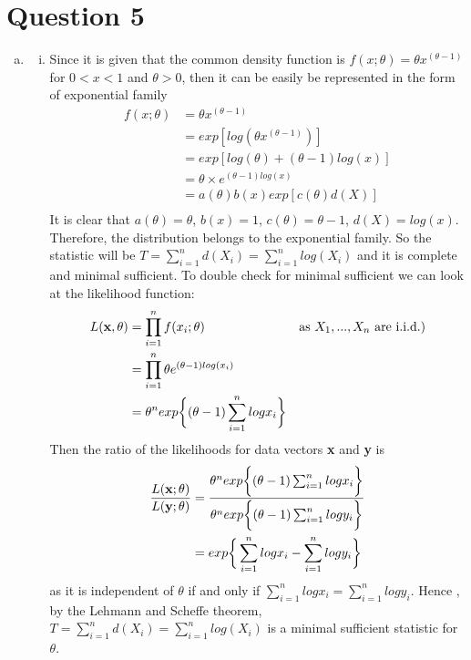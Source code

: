 \documentclass[a4paper,11pt]{article}
\begin{document}
\section{Question 5}
\begin{enumerate}[(a)]
	\item
	\begin{enumerate}[(i)]
		\item
			Since it is given that the common density function is $f(x;\theta) = \theta x^{(\theta-1)}$ for  $0<x<1$ and $\theta>0$, then  it can be easily be represented in the form of exponential family
			\begin{align*}
				f(x;\theta) &= \theta x^{(\theta-1)} \\
				&= exp[ log( \theta x^{(\theta-1)} )] \\
				&= exp[ log(\theta)+(\theta-1)log(x)]\\
				&= \theta \times e^{(\theta-1)log(x)}\\
				&= a(\theta)b(x) exp[c(\theta)d(X)]\\
			\end{align*}
			It is clear that $a(\theta) = \theta$, $b(x)=1$, $c(\theta)=\theta-1$, $d(X)=log(x)$. Therefore, the distribution belongs to the exponential family. So the statistic will be $T = \sum^n_{i=1}d(X_i) =  \sum^n_{i=1} log(X_i)$ and it is complete and minimal sufficient. To double check for minimal sufficient we can look at the likelihood function:
			\begin{align*}
			L({\bf x}, \theta) &= \prod^n_{i=1}f(x_i;\theta) & \mbox{as }X_1, ... , X_n\mbox{ are i.i.d.)}\\
			&= \prod^n_{i=1} \theta e^{(\theta-1)log(x_i)}\\
			&=\theta^n exp\bigg\{(\theta-1)\sum^n_{i=1} log x_i \bigg\}
			\end{align*}
			Then the ratio of the likelihoods for data vectors {\bf x} and {\bf y} is
			\begin{align*}
			 \frac{L({\bf x};\theta)}{L({\bf y};\theta)}&=\frac{\theta^n exp\bigg\{(\theta-1)\sum^n_{i=1} log x_i \bigg\}}{\theta^n exp\bigg\{(\theta-1)\sum^n_{i=1} log y_i \bigg\}}\\
			&=exp\bigg\{\sum^n_{i=1} log x_i-\sum^n_{i=1} log y_i \bigg\}\\
			\end{align*}
			as it is independent of $\theta$ if and only if $\sum^n_{i=1} log x_i=\sum^n_{i=1} log y_i$. Hence , by the Lehmann and Scheffe theorem, $T = \sum^n_{i=1}d(X_i) =  \sum^n_{i=1} log(X_i)$ is a minimal sufficient statistic for $\theta$.

\end{enumerate}
\end{enumerate}
\end{document}
